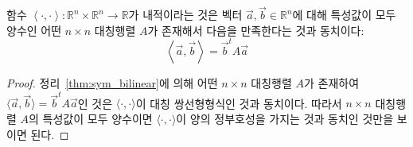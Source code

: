 \documentclass[sections/engineering_mathematics_lecture_note.tex]{subfiles}
\begin{document}
\begin{theorem}
    함수 $\left<\cdot, \cdot\right>: \mathbb R^n \times \mathbb R^n \rightarrow \mathbb R$가 내적이라는 것은 벡터 $\vec a, \vec b \in \mathbb R^n$에 대해 특성값이 모두 양수인 어떤 $n \times n$ 대칭행렬 $A$가 존재해서 다음을 만족한다는 것과 동치이다:
    \begin{equation*}
        \left<\vec a, \vec b\right> = \vec b^t A \vec a
    \end{equation*}
\end{theorem}

\begin{proof}
    정리~\ref{thm:sym_bilinear}에 의해 어떤 $n \times n$ 대칭행렬 $A$가 존재하여 $\langle \vec a, \vec b \rangle = \vec b^t A \vec a$인 것은 $\langle\cdot, \cdot\rangle$이 대칭 쌍선형형식인 것과 동치이다.
    따라서 $n \times n$ 대칭행렬 $A$의 특성값이 모두 양수이면 $\langle \cdot, \cdot \rangle$이 양의 정부호성을 가지는 것과 동치인 것만을 보이면 된다.


\end{proof}
\end{document}

